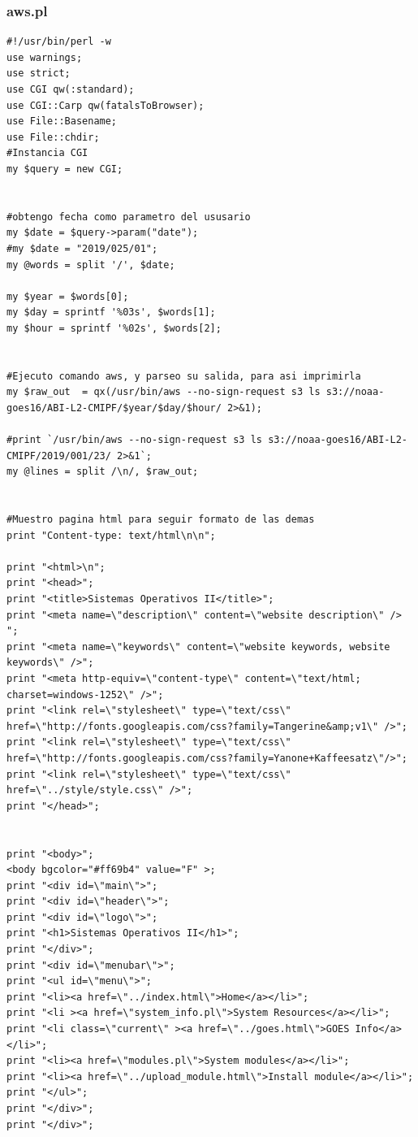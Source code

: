 \documentclass{article}
\begin{document}
\subsubsection{aws.pl}
\begin{lstlisting}[style=PerlStyle]
#!/usr/bin/perl -w
use warnings;
use strict;
use CGI qw(:standard);
use CGI::Carp qw(fatalsToBrowser);
use File::Basename;
use File::chdir;
#Instancia CGI
my $query = new CGI;


#obtengo fecha como parametro del ususario
my $date = $query->param("date");
#my $date = "2019/025/01";
my @words = split '/', $date;

my $year = $words[0];
my $day = sprintf '%03s', $words[1];
my $hour = sprintf '%02s', $words[2];


#Ejecuto comando aws, y parseo su salida, para asi imprimirla
my $raw_out  = qx(/usr/bin/aws --no-sign-request s3 ls s3://noaa-goes16/ABI-L2-CMIPF/$year/$day/$hour/ 2>&1);

#print `/usr/bin/aws --no-sign-request s3 ls s3://noaa-goes16/ABI-L2-CMIPF/2019/001/23/ 2>&1`;
my @lines = split /\n/, $raw_out;


#Muestro pagina html para seguir formato de las demas
print "Content-type: text/html\n\n";

print "<html>\n";
print "<head>";
print "<title>Sistemas Operativos II</title>";
print "<meta name=\"description\" content=\"website description\" /> ";
print "<meta name=\"keywords\" content=\"website keywords, website keywords\" />";
print "<meta http-equiv=\"content-type\" content=\"text/html; charset=windows-1252\" />";
print "<link rel=\"stylesheet\" type=\"text/css\" href=\"http://fonts.googleapis.com/css?family=Tangerine&amp;v1\" />";
print "<link rel=\"stylesheet\" type=\"text/css\" href=\"http://fonts.googleapis.com/css?family=Yanone+Kaffeesatz\"/>";
print "<link rel=\"stylesheet\" type=\"text/css\" href=\"../style/style.css\" />";
print "</head>";


print "<body>";
<body bgcolor="#ff69b4" value="F" >;
print "<div id=\"main\">";
print "<div id=\"header\">";
print "<div id=\"logo\">";
print "<h1>Sistemas Operativos II</h1>";
print "</div>";
print "<div id=\"menubar\">";
print "<ul id=\"menu\">";
print "<li><a href=\"../index.html\">Home</a></li>";
print "<li ><a href=\"system_info.pl\">System Resources</a></li>";
print "<li class=\"current\" ><a href=\"../goes.html\">GOES Info</a></li>";
print "<li><a href=\"modules.pl\">System modules</a></li>";
print "<li><a href=\"../upload_module.html\">Install module</a></li>";
print "</ul>";
print "</div>";
print "</div>";



\end{lstlisting}
\end{document}
